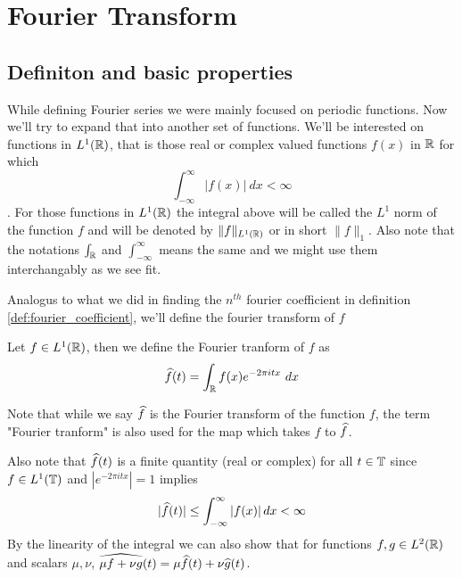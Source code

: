 \newpage
\section{Fourier Transform}

\subsection{Definiton and basic properties}
  While defining Fourier series we were mainly focused on periodic functions. Now we'll try to expand that into another set of functions. We'll be interested on functions in $L^1(\mathbb R)$, that is those real or complex valued functions $f(x)$ in $\mathbb R$ for which $$\int_{-\infty}^{\infty} |f(x)| \ dx < \infty$$. For those functions in $L^1(\mathbb R)$ the integral above will be called the $L^1$ norm of the function $f$ and will be denoted by $\|f\|_{L^1(\mathbb R)}$ or in short $\|f\|_1$. Also note that the notations $\int_{\mathbb R}$ and $\int_{-\infty}^{\infty}$ means the same and we might use them interchangably as we see fit.

  Analogus to what we did in finding the $n^{th}$ fourier coefficient in definition \ref{def:fourier_coefficient}, we'll define the fourier transform of $f$

  \begin{definition}
    \label{def:fourier_transform_of_f}
    Let $f \in L^1(\mathbb R)$, then we define the Fourier tranform of $f$ as $$\widehat{f}(t) = \int_{\mathbb R} f(x) e^{-2 \pi itx} \ dx$$
  \end{definition}
  Note that while we say $\widehat{f}$ is the Fourier transform of the function $f$, the term "Fourier tranform" is also used for the map which takes $f$ to $\widehat{f}$.

  Also note that $\widehat{f}(t)$ is a finite quantity (real or complex) for all $t \in \mathbb T$ since $f\in L^1(\mathbb T)$ and $|e^{-2 \pi itx}| = 1$ implies $$|\widehat{f}(t)| \le \int_{-\infty}^{\infty}\left|f(x)\right| dx < \infty$$ By the linearity of the integral we can also show that for functions $f, g \in L^2(\mathbb R)$ and scalars $\mu, \nu$, $\widehat{\mu f + \nu g}(t) = \mu \widehat{f}(t) + \nu\widehat{g}(t)$.

